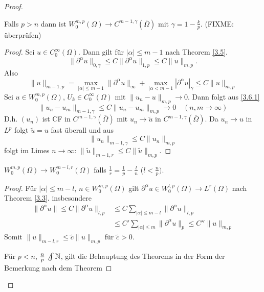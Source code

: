 \documentclass[
paper=a4,
bibtotocnumbered,
liststotocnumbered,
tablecaptionabove,
pointlessnumbers,
twoside,
openright,
10pt
]
{report}
\theoremstyle{definition}
\numberwithin{equation}{chapter}
\begin{document}
 \begin{proof}
 \begin{enumerate}
 	\item Falls $p>n$ dann ist $W_0^{m,p}(\Omega) \to C^{m-1, \gamma} (\overline\Omega)$ mit $\gamma = 1- \frac{k}{p}$. (FIXME: überprüfen)
 	\begin{proof}
		Sei $u\in C_0^\infty(\Omega)$. Dann gilt für $|\alpha|\le m-1$ nach Theorem \ref{3.5}.
		\begin{equation}
			\|\partial^\alpha u\|_{0,\gamma} \le C \| \partial^\alpha u\|_{1,p} \le C\| u \|_{m,p}.
		\end{equation}
		Also
		\begin{equation}\label{3.6.1}
			\|u\|_{m-1,p} = \max_{|\alpha|\le m-1} \| \partial^\alpha u \|_\infty + \max_{|\alpha < m-1} | \partial^\alpha u|_\gamma \le C\| u \|_{m,p}
		\end{equation}
		Sei $u\in W_0^{m,p}(\Omega)$, $U_k \in C_0^\infty(\Omega)$ mit $\| u_n - u\|_{m,p} \to 0$. Dann folgt aus \eqref{3.6.1}
		\begin{equation}
			\| u_n - u_m \|_{m-1, \gamma} \le C \| u_n - u_m \|_{m,p} \to 0 \quad (n,m\to \infty)
		\end{equation}
		D.h. $(u_n)$ ist CF in $C^{m-1, \gamma}(\overline{\Omega})$ mit $u_n \to \tilde u$ in $C^{m-1, \gamma}(\overline{\Omega})$. Da $u_n \to u$ in $L^p$ folgt $\tilde u = u$ fast überall und aus
		\begin{equation}
			\| u_n \|_{m-1, \gamma} \le C \| u_n \|_{m,p}
		\end{equation}
		folgt im Limes $n\to \infty$: $\| \tilde u\|_{m-1, r} \le C\| \tilde u \|_{m,p}$.
 	\end{proof}
 \item $W_0^{m,p}(\Omega) \to W_0^{m-l,r}(\Omega)$ falls $\frac{1}{r} = \frac{1}{p} - \frac{l}{n}$ ($l < \frac{n}{p})$.
	\begin{proof}
		Für $|\alpha|\le m-l$, $n\in W_0^{m,p}(\Omega)$ gilt $\partial^\alpha u \in W_0^{l,p}(\Omega) \to L^r(\Omega)$ nach Theorem \ref{3.3}. insbesondere
		\begin{align*}
			\|\partial^\alpha u \| \le C\| \partial ^\alpha u\|_{l,p}&\le C\sum_{|\alpha|\le m-l} \| \partial^\alpha u\|_{l,p}\\
										 &\le C' \sum_{|\alpha | \le m} \| \partial^\alpha u \|_p \le C'' \| u\|_{m,p} 
		\end{align*}
		Somit $\|u\|_{m-l, r} \le \tilde c \| u\|_{m,p}$ für $\tilde c>0$.
	\item Für $p<n$, $\frac{n}{p} \not\int \mathbb N$, gilt die Behauptung des Theorems in der Form der Bemerkung nach dem Theorem

\end{proof}
\end{enumerate}
\end{proof}
\end{document}
